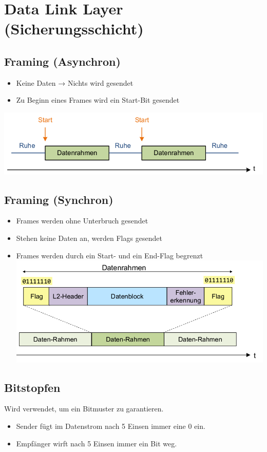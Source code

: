 
\newpage
\section{Data Link Layer (Sicherungsschicht)}

\subsection{Framing (Asynchron)}{
\begin{itemize}[noitemsep]
    \item Keine Daten → Nichts wird gesendet
    \item Zu Beginn eines Frames wird ein Start-Bit gesendet
\end{itemize}

{\includegraphics[scale=.3]{img/framing_async.png}}
}

\subsection{Framing (Synchron)}{

    \begin{itemize}[noitemsep]
        \item Frames werden ohne Unterbruch gesendet
        \item Stehen keine Daten an, werden Flags gesendet
        \item Frames werden durch ein Start- und ein End-Flag begrenzt 
        {\includegraphics[scale=.275]{img/framing_sync.png}}
    \end{itemize}
}

\subsection{Bitstopfen}{
    Wird verwendet, um ein Bitmuster zu garantieren.

    \begin{itemize}[noitemsep]
        \item Sender fügt im Datenstrom nach 5 Einsen immer eine 0 ein.
        \item Empfänger wirft nach 5 Einsen immer ein Bit weg.
    \end{itemize}
}


